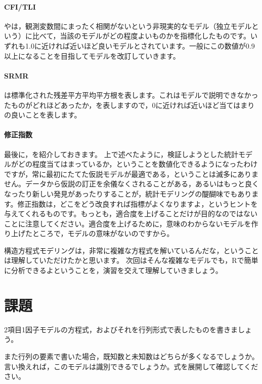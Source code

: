 \documentclass{ltjsbook}
\begin{document}
\paragraph{CFI/TLI}
やは，観測変数間にまったく相関がないという非現実的なモデル（独立モデルという）に比べて，当該のモデルがどの程度よいものかを指標化したものです。いずれも1.0に近ければ近いほど良いモデルとされています。一般にこの数値が0.9以上になることを目指してモデルを改訂していきます。
\paragraph{SRMR}
は標準化された残差平方平均平方根を表します。これはモデルで説明できなかったものがどれほどあったか，を表しますので，0に近ければ近いほど当てはまりの良いことを表します。
\paragraph{修正指数}
最後に，を紹介しておきます。
上で述べたように，検証しようとした統計モデルがどの程度当てはまっているか，ということを数値化できるようになったわけですが，常に最初にたてた仮説モデルが最適である，ということは滅多にありません。データから仮説の訂正を余儀なくされることがある，あるいはもっと良くなったり新しい発見があったりすることが，統計モデリングの醍醐味でもあります。修正指数は，どこをどう改良すれば指標がよくなりますよ，というヒントを与えてくれるものです。もっとも，適合度を上げることだけが目的なのではないことに注意してください。適合度を上げるために，意味のわからないモデルを作り上げたところで，モデルの意味がないのですから。


構造方程式モデリングは，非常に複雑な方程式を解いているんだな，ということは理解していただけたかと思います。
次回はそんな複雑なモデルでも，Rで簡単に分析できるよということを，演習を交えて理解していきましょう。
\section{課題}
2項目1因子モデルの方程式，およびそれを行列形式で表したものを書きましょう。

また行列の要素で書いた場合，既知数と未知数はどちらが多くなるでしょうか。言い換えれば，このモデルは識別できるでしょうか。式を展開して確認してください。
\end{document}
